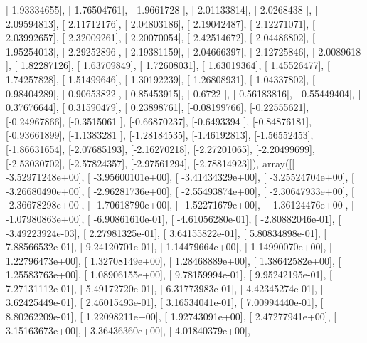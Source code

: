 \documentclass{article}
\begin{document}
       [ 1.93334655],
       [ 1.76504761],
       [ 1.9661728 ],
       [ 2.01133814],
       [ 2.0268438 ],
       [ 2.09594813],
       [ 2.11712176],
       [ 2.04803186],
       [ 2.19042487],
       [ 2.12271071],
       [ 2.03992657],
       [ 2.32009261],
       [ 2.20070054],
       [ 2.42514672],
       [ 2.04486802],
       [ 1.95254013],
       [ 2.29252896],
       [ 2.19381159],
       [ 2.04666397],
       [ 2.12725846],
       [ 2.0089618 ],
       [ 1.82287126],
       [ 1.63709849],
       [ 1.72608031],
       [ 1.63019364],
       [ 1.45526477],
       [ 1.74257828],
       [ 1.51499646],
       [ 1.30192239],
       [ 1.26808931],
       [ 1.04337802],
       [ 0.98404289],
       [ 0.90653822],
       [ 0.85453915],
       [ 0.6722    ],
       [ 0.56183816],
       [ 0.55449404],
       [ 0.37676644],
       [ 0.31590479],
       [ 0.23898761],
       [-0.08199766],
       [-0.22555621],
       [-0.24967866],
       [-0.3515061 ],
       [-0.66870237],
       [-0.6493394 ],
       [-0.84876181],
       [-0.93661899],
       [-1.1383281 ],
       [-1.28184535],
       [-1.46192813],
       [-1.56552453],
       [-1.86631654],
       [-2.07685193],
       [-2.16270218],
       [-2.27201065],
       [-2.20499699],
       [-2.53030702],
       [-2.57824357],
       [-2.97561294],
       [-2.78814923]]), array([[ -3.52971248e+00],
       [ -3.95600101e+00],
       [ -3.41434329e+00],
       [ -3.25524704e+00],
       [ -3.26680490e+00],
       [ -2.96281736e+00],
       [ -2.55493874e+00],
       [ -2.30647933e+00],
       [ -2.36678298e+00],
       [ -1.70618790e+00],
       [ -1.52271679e+00],
       [ -1.36124476e+00],
       [ -1.07980863e+00],
       [ -6.90861610e-01],
       [ -4.61056280e-01],
       [ -2.80882046e-01],
       [ -3.49223924e-03],
       [  2.27981325e-01],
       [  3.64155822e-01],
       [  5.80834898e-01],
       [  7.88566532e-01],
       [  9.24120701e-01],
       [  1.14479664e+00],
       [  1.14990070e+00],
       [  1.22796473e+00],
       [  1.32708149e+00],
       [  1.28468889e+00],
       [  1.38642582e+00],
       [  1.25583763e+00],
       [  1.08906155e+00],
       [  9.78159994e-01],
       [  9.95242195e-01],
       [  7.27131112e-01],
       [  5.49172720e-01],
       [  6.31773983e-01],
       [  4.42345274e-01],
       [  3.62425449e-01],
       [  2.46015493e-01],
       [  3.16534041e-01],
       [  7.00994440e-01],
       [  8.80262209e-01],
       [  1.22098211e+00],
       [  1.92743091e+00],
       [  2.47277941e+00],
       [  3.15163673e+00],
       [  3.36436360e+00],
       [  4.01840379e+00],
\end{document}

